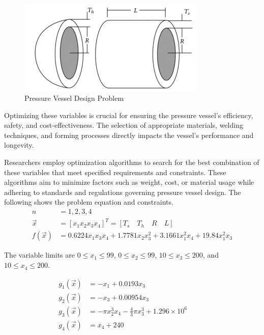 \documentclass[
]{article}
\begin{document}
\begin{justify}
{\begin{figure}[htbp]
    \centering
    \includegraphics[width=0.8\textwidth]{pressure_vessel.png}
    \caption{Pressure Vessel Design Problem}
    \label{fig:pressure_vessel}
\end{figure}

Optimizing these variables is crucial for ensuring the pressure vessel's efficiency, safety, and cost-effectiveness. The selection of appropriate materials, welding techniques, and forming processes directly impacts the vessel's performance and longevity.

Researchers employ optimization algorithms to search for the best combination of these variables that meet specified requirements and constraints. These algorithms aim to minimize factors such as weight, cost, or material usage while adhering to standards and regulations governing pressure vessel design.
The following shows the problem equation and constraints.
\\
\begin{align*}
n &= 1, 2, 3, 4 \\
\vec{x} &= [x_1 x_2 x_3 x_4]^T = [T_s \quad T_h \quad R \quad L] \\
f(\vec{x}) &= 0.6224x_1x_3x_4 + 1.7781x_2x_3^2 + 3.1661x_1^2x_4 + 19.84x_1^2x_3 \tag{16}
\end{align*}

The variable limits are \(0 \leq x_1 \leq 99\), \(0 \leq x_2 \leq 99\), \(10 \leq x_3 \leq 200\), and \(10 \leq x_4 \leq 200\).

\begin{align*}
\tag{17}
g_1(\vec{x}) &= -x_1 + 0.0193x_3 \phantom{{} \leq 0} &  \\
\tag{18}
g_2(\vec{x}) &= -x_3 + 0.00954x_3 \phantom{{} \leq 0}  \\
\tag{19}
g_3(\vec{x}) &= -\pi x_2^3 x_4 - \frac{4}{3} \pi x_3^3 + 1.296 \times 10^6 \phantom{{} \leq 0} & \\
\tag{20}
g_4(\vec{x}) &= x_4 + 240 \phantom{{} \leq 0} 
\end{align*}


}
\end{justify}
\end{document}
